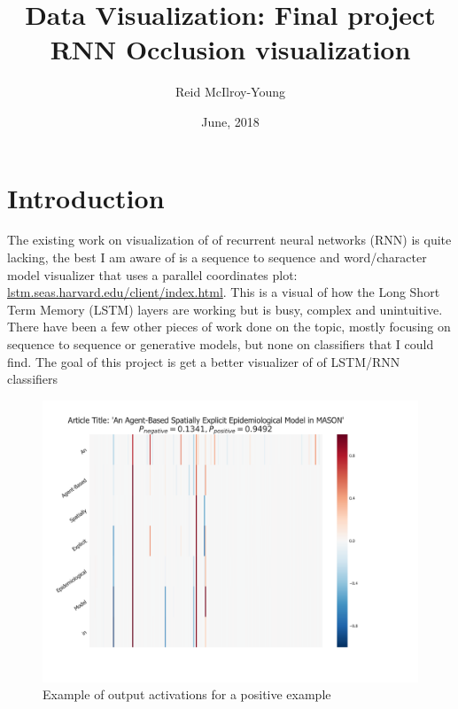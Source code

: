 \documentclass[12pt, a4paper]{article}
\author{Reid McIlroy-Young}
\title{Data Visualization: Final project\\RNN Occlusion visualization}
\date{June, 2018}
\begin{document}
	\maketitle
	\section*{Introduction}
	
	The existing work on visualization of of recurrent neural networks (RNN) is quite lacking, the best I am aware of is a sequence to sequence and word/character model visualizer that uses a parallel coordinates plot: \href{http://lstm.seas.harvard.edu/client/index.html}{lstm.seas.harvard.edu/client/index.html}. This is a visual of how the Long Short Term Memory (LSTM) layers are working but is busy, complex and unintuitive. There have been a few other pieces of work done on the topic, mostly focusing on sequence to sequence or generative models, but none on classifiers that I could find. The goal of this project is get a better visualizer of of LSTM/RNN classifiers 
	
	\begin{figure}[ht]
		\centering
		\begin{adjustbox}{center}
			\includegraphics[width=1\textwidth]{activations}
		\end{adjustbox}
		\caption{Example of output activations for a positive example}\label{acts}
	\end{figure}
	
\end{document}
